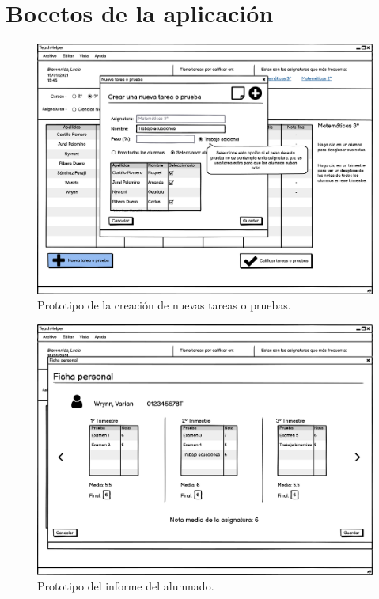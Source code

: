 \section{Bocetos de la aplicación}
\label{ana:bocetos}
\begin{figure}[H]
\centering\includegraphics[width=1\linewidth]{figs/mockup_nuevatarea.png}
\caption{Prototipo de la creación de nuevas tareas o pruebas.}
\label{Fig:mockup_nuevatarea}
\end{figure}

\newpage

\begin{figure}[H]
\centering\includegraphics[width=1\linewidth]{figs/mockup_informealumno.png}
\caption{Prototipo del informe del alumnado.}
\label{Fig:mockup_informealumno}
\end{figure}

